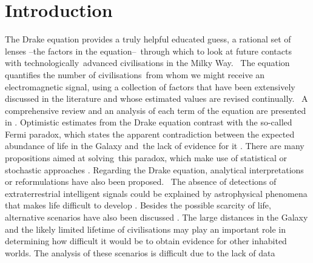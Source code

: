 \documentclass[crop]{CSLB}
\begin{document}
\maketitle


\section{Introduction}\label{S_motivations}

The Drake equation  \citep{drake_intelligent_1962} provides a truly
helpful educated guess, a rational set of lenses --the factors in the
equation-- through which to look at future contacts with
technologically advanced civilisations in the Milky Way. 
%
The equation quantifies the number of civilisations from whom we might
receive an electromagnetic signal, using a collection of factors that
have been extensively discussed in the literature and whose estimated
values are revised continually. 
%
A comprehensive review and an analysis of each term of the equation are
presented in \citet{vakoch_drake_2015}.
%
Optimistic estimates from the Drake equation contrast with the
so-called Fermi paradox, which states the apparent contradiction between the
expected abundance of life in the Galaxy and the lack of evidence for
it \citep[e.g. ][]{hart_explanation_1975, brin_great_1983,
barlow_galactic_2012, forgan_galactic_2016, anchordoqui_is_2017,
Sotos_biotechnology_2019, carroll_nellemback_fermi_2019}.
%
There are many propositions aimed at solving this paradox, which make
use of statistical \citep{solomonides_probabilistic_2016, horvat_calculating_2007,
maccone_statistical_2015} or stochastic approaches
\citep{forgan_numerical_2009, bloetscher_using_2019,
glade_stochastic_2011, forgan_numerical_2010}.
%
Regarding the Drake equation, analytical interpretations
\citep{prantzos_joint_2013, smith_broadcasting_2009} or reformulations
\citep[][and references therein]{burchell_whither_2006} have also been
proposed. 
%
The absence of detections of extraterrestrial intelligent signals
could be explained by
astrophysical phenomena that makes life difficult to develop
\citep{annis_astrophysical_1999}.
%
Besides the possible scarcity of life,
alternative scenarios have also been discussed
\citep{barlow_galactic_2013, lampton_information_2013,
conway_three_2018, forgan_galactic_2017}.
%
The large distances in the Galaxy and the likely limited lifetime of
civilisations may play an important role in determining how difficult it
would be to obtain evidence for other inhabited worlds.
%
The analysis of these scenarios is difficult due to the lack of data
\end{document}
